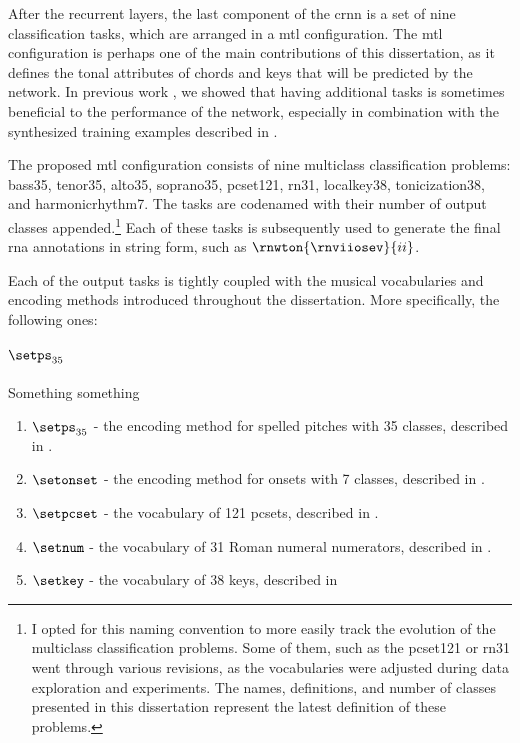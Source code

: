 
After the recurrent layers, the last component of the
\gls{crnn} is a set of nine classification tasks, which are
arranged in a \gls{mtl} configuration. The \gls{mtl}
configuration is perhaps one of the main contributions of
this dissertation, as it defines the tonal attributes of
chords and keys that will be predicted by the network. In
previous work \parencite{napoleslopez2021augmentednet}, we
showed that having additional tasks is sometimes beneficial
to the performance of the network, especially in combination
with the synthesized training examples described in
.

The proposed \gls{mtl} configuration consists of nine
multiclass classification problems: \gls{bass35},
\gls{tenor35}, \gls{alto35}, \gls{soprano35},
\gls{pcset121}, \gls{rn31}, \gls{localkey38},
\gls{tonicization38}, and \gls{harmonicrhythm7}. The tasks
are codenamed with their number of output classes
appended.\footnote{I opted for this naming convention to
more easily track the evolution of the multiclass
classification problems. Some of them, such as the
\gls{pcset121} or \gls{rn31} went through various revisions,
as the vocabularies were adjusted during data exploration
and experiments. The names, definitions, and number of
classes presented in this dissertation represent the latest
definition of these problems.} Each of these tasks is
subsequently used to generate the final \gls{rna}
annotations in string form, such as
$\rnwton{\rnviiosev}{ii}$.

Each of the output tasks is tightly coupled with the musical
vocabularies and encoding methods introduced throughout the
dissertation. More specifically, the following ones:

\paragraph{$\setps_{35}$}

Something something


\begin{enumerate}
    \item $\setps_{35}$ - the encoding method for spelled
    pitches with 35 classes, described in
    .
    \item $\setonset$ - the encoding method for onsets with 7
    classes, described in
    .
    \item $\setpcset$ - the vocabulary of 121 \gls{pcset}s,
    described in .
    \item $\setnum$ - the vocabulary of 31 Roman numeral
    numerators, described in
    .
    \item $\setkey$ - the vocabulary of 38 keys, described in
\end{enumerate}
